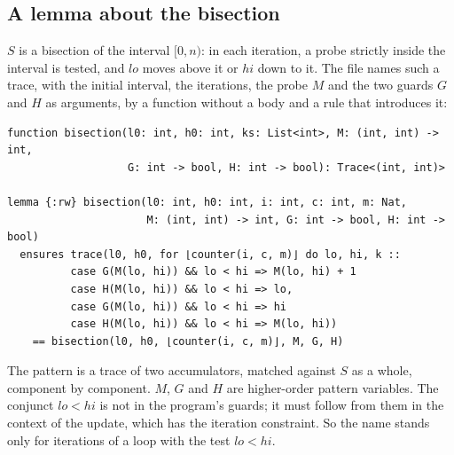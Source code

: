 \documentclass[11pt,a4paper]{article}
\begin{document}
\subsection{A lemma about the bisection}

$S$ is a bisection of the interval $[0, n)$: in each iteration, a probe strictly inside the interval is tested,
and $lo$ moves above it or $hi$ down to it. The file names such a trace, with the initial interval, the iterations,
the probe $M$ and the two guards $G$ and $H$ as arguments, by a function without a body and a rule that introduces
it:
\begin{lstlisting}
function bisection(l0: int, h0: int, ks: List<int>, M: (int, int) -> int,
                   G: int -> bool, H: int -> bool): Trace<(int, int)>

lemma {:rw} bisection(l0: int, h0: int, i: int, c: int, m: Nat,
                      M: (int, int) -> int, G: int -> bool, H: int -> bool)
  ensures trace(l0, h0, for ⌊counter(i, c, m)⌋ do lo, hi, k ::
          case G(M(lo, hi)) && lo < hi => M(lo, hi) + 1
          case H(M(lo, hi)) && lo < hi => lo,
          case G(M(lo, hi)) && lo < hi => hi
          case H(M(lo, hi)) && lo < hi => M(lo, hi))
    == bisection(l0, h0, ⌊counter(i, c, m)⌋, M, G, H)
\end{lstlisting}
The pattern is a trace of two accumulators, matched against $S$ as a whole, component by component. $M$, $G$ and
$H$ are higher-order pattern variables. The conjunct $lo < hi$ is not in the program's guards; it must follow from
them in the context of the update, which has the iteration constraint. So the name stands only for iterations of a
loop with the test $lo < hi$.
\end{document}
